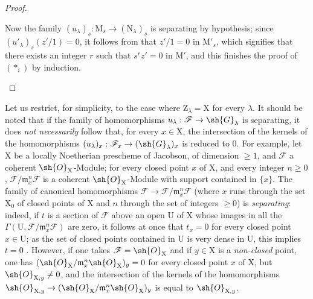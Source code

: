 \begin{proof}
\begin{enumerate}[label=(\roman*)]
  Now the family $(u_\lambda)_s:\mathrm{M}_s\to(\mathrm{N}_\lambda)_s$ is separating by hypothesis; since $(u'_\lambda)_s(z'/1)=0$, it follows from  that $z'/1=0$ in $\mathrm{M}'_s$, which signifies that there exists an integer $r$ such that $s^r z'=0$ in $\mathrm{M}'$, and this finishes the proof of $(*_i)$ by induction.
\end{enumerate}
\end{proof}

\begin{remark}[11.9.11]
\label{IV.11.9.11}
Let us restrict, for simplicity, to the case where $\mathrm{Z}_\lambda=\mathrm{X}$ for every $\lambda$.
It should be noted that if the family of homomorphisms $u_\lambda:\mathscr{F}\to\sh{G}_\lambda$ is separating, it does \emph{not necessarily} follow that, for every $x\in\mathrm{X}$, the intersection of the kernels of the homomorphisms $(u_\lambda)_x:\mathscr{F}_x\to(\sh{G}_\lambda)_x$ is reduced to $0$.
For example, let $\mathrm{X}$ be a locally Noetherian prescheme of Jacobson, of dimension $\geq 1$, and $\mathscr{F}$ a coherent $\sh{O}_\mathrm{X}$-Module; for every closed point $x$ of $\mathrm{X}$, and every integer $n\geq 0$, $\mathscr{F}/\mathfrak{m}_x^n\mathscr{F}$ is a coherent $\sh{O}_\mathrm{X}$-Module with support contained in $\{x\}$.
The family of canonical homomorphisms $\mathscr{F}\to\mathscr{F}/\mathfrak{m}_x^n\mathscr{F}$ (where $x$ runs through the set $\mathrm{X}_0$ of closed points of $\mathrm{X}$ and $n$ through the set of integers $\geq 0$) is \emph{separating}: indeed, if $t$ is a section of $\mathscr{F}$ above an open $\mathrm{U}$ of $\mathrm{X}$ whose images in all the $\Gamma(\mathrm{U},\mathscr{F}/\mathfrak{m}_x^n\mathscr{F})$ are zero, it follows at once that $t_x=0$ for every closed point $x\in\mathrm{U}$; as the set of closed points contained in $\mathrm{U}$ is very dense in $\mathrm{U}$, this implies $t=0$ .
However, if one takes $\mathscr{F}=\sh{O}_\mathrm{X}$ and if $y\in\mathrm{X}$ is a \emph{non-closed} point, one has $(\sh{O}_\mathrm{X}/\mathfrak{m}_x^n\sh{O}_\mathrm{X})_y=0$ for every closed point $x$ of $\mathrm{X}$, but $\sh{O}_{\mathrm{X},y}\neq 0$, and the intersection of the kernels of the homomorphisms $\sh{O}_{\mathrm{X},y}\to(\sh{O}_\mathrm{X}/\mathfrak{m}_x^n\sh{O}_\mathrm{X})_y$ is equal to $\sh{O}_{\mathrm{X},y}$.
\end{remark}

